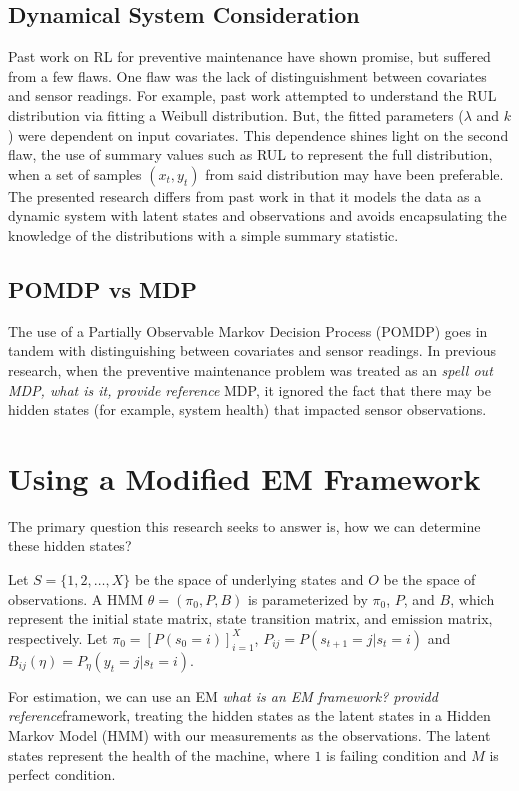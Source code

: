\documentclass[english]{article}
\numberwithin{equation}{section}
\begin{document}
	\subsection*{Dynamical System Consideration}
	Past work on RL for preventive maintenance have shown promise, but suffered from a few flaws. One flaw was the lack of distinguishment between covariates and sensor readings. For example, past work attempted to understand the RUL distribution via fitting a Weibull distribution. But, the fitted parameters ($\lambda$ and $k$) were dependent on input covariates. This dependence shines light on the second flaw, the use of summary values such as RUL to represent the full distribution, when a set of samples $(x_t,y_t)$ from said distribution may have been preferable. The presented research differs from past work in that it models the data as a dynamic system with latent states and observations and avoids encapsulating the knowledge of the distributions with a simple summary statistic.
	
	\subsection*{POMDP vs MDP}
	The use of a Partially Observable Markov Decision Process (POMDP) goes in tandem with distinguishing between covariates and sensor readings. In previous research, when the preventive maintenance problem was treated as an \textit{spell out MDP, what is it, provide reference}  MDP, it ignored the fact that there may be hidden states (for example, system health) that impacted sensor observations.
	
	\section*{Using a Modified EM Framework}
	The primary question this research seeks to answer is, how we can determine these hidden states?
	
	Let $S=\{1,2,\ldots,X\}$ be the space of underlying states and $O$ be the space of observations. A HMM $\theta=(\pi_0,P,B)$ is parameterized by $\pi_0$, $P$, and $B$, which represent the initial state matrix, state transition matrix, and emission matrix, respectively. Let $\pi_0=[P(s_0=i)]_{i=1}^X$, $P_{ij}=P(s_{t+1}=j|s_t=i)$ and $B_{ij}(\eta)=P_{\eta}(y_t=j|s_t=i)$.
	
	For estimation, we can use an EM \textit{what is an EM framework?  providd reference}framework, treating the hidden states as the latent states in a Hidden Markov Model (HMM) with our measurements as the observations. The latent states represent the health of the machine, where $1$ is failing condition and $M$ is perfect condition.
	
\end{document}

